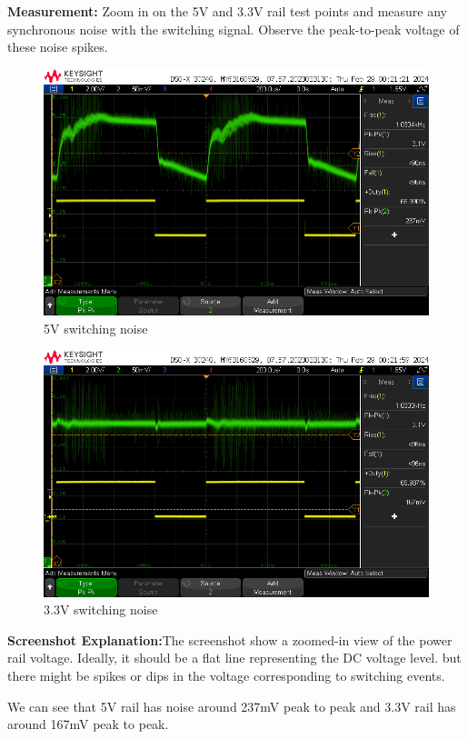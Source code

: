 \documentclass[a4paper,11pt]{article}%
\begin{document}
\begin{enumerate}
	\textbf{Measurement:} Zoom in on the 5V and 3.3V rail test points and measure any synchronous noise with the switching signal. Observe the peak-to-peak voltage of these noise spikes.

	\begin{figure}[H]
		\centering
		\includegraphics[scale=0.6]{figures/5v_switching_noise}
		\caption{5V switching noise}
	
	\end{figure}

	\begin{figure}[H]
		\centering
		\includegraphics[scale=0.6]{figures/3v_switching_noise}
		\caption{3.3V switching noise}
	
	\end{figure}

	\textbf{Screenshot Explanation:}The screenshot show a zoomed-in view of the power rail voltage. Ideally, it should be a flat line representing the DC voltage level. but there might be spikes or dips in the voltage corresponding to switching events. 

	We can see that 5V rail has noise around 237mV peak to peak and 3.3V rail has around 167mV peak to peak.

\end{enumerate}
\end{document}
